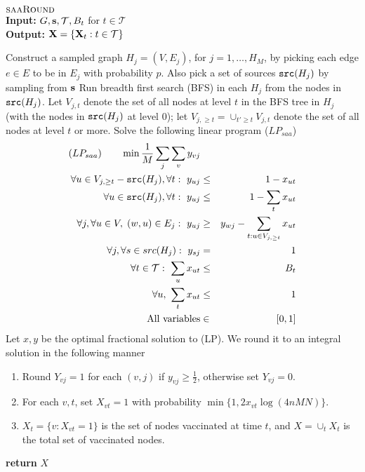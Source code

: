 \begin{algorithm}{}
\small
\caption{\small $\textsc{saaRound}{}$\\
\textbf{Input:} $G, \mathbf{s}, \mathcal{T}, B_t$ for $t\in\mathcal{T}$\\
\textbf{Output:} $\mathbf{X}=\{\mathbf{X}_t: t\in\mathcal{T}\}$
}
\label{alg:saaround}
\begin{algorithmic}[1]
\STATE
Construct a sampled graph $H_j=(V, E_j)$, for $j=1,\ldots,H_M$, by picking each edge $e\in E$ to be in $E_j$
with probability $p$. Also pick a set of sources $\texttt{src}(H_j)$ by sampling from $\mathbf{s}$
\STATE
Run breadth first search (BFS) in each $H_j$ from the nodes in $\texttt{src}(H_j)$.
Let $V_{j,t}$ denote the set of all nodes at level $t$ in the BFS tree in $H_j$ 
(with the nodes in $\texttt{src}(H_j)$ at level $0$); let $V_{j,\geq t}=\cup_{t'\geq t} V_{j,t}$ denote
the set of all nodes at level $t$ or more.
\STATE
Solve the following linear program ($LP_{saa}$)
\begin{eqnarray}
\label{eqn:obj}
(LP_{saa}) \qquad  \min \frac{1}{M}\sum_j \sum_v y_{vj} && \\
\label{eqn:xy}
\forall u \in V_{j, \geq t} - \texttt{src}(H_j), \forall t:\ y_{uj} &\leq& 1 - x_{ut} \\
\label{eqn:xy2}
\forall u \in \texttt{src}(H_j), \forall t:\ y_{uj} &\leq& 1 - \sum_t x_{ut} \\
\label{eqn1}
\forall j, \forall u\in V, \; (w, u)\in E_j:\ y_{uj} &\geq& y_{wj} - \sum_{t: u \in V_{j, \geq t}} x_{ut}\\
\label{eqn:src}
\forall j, \forall s \in src(H_j):\ y_{sj} &=& 1\\
\label{eqn:budget}
\forall t\in\mathcal{T}:\ \sum_u x_{ut} &\leq& B_t\\
\label{eqn:uniqt}
\forall u,\ \sum_t x_{ut} &\leq& 1\\
\mbox{All variables} &\in& [0, 1]
\end{eqnarray}
\STATE
Let $x, y$ be the optimal fractional solution to (LP).
We round it to an integral solution in the following manner
\begin{enumerate}
\item
Round $Y_{vj} = 1$ for each $(v,j)$ if $y_{vj} \geq \frac{1}{2}$, otherwise set $Y_{vj} = 0$.
\item
For each $v, t$, set $X_{vt}=1$ with probability $\min\{1, 2 x_{vt}\log(4nMN)\}$. 
\item
$X_t=\{v: X_{vt}=1\}$ is the set of nodes vaccinated at time $t$, and $X=\cup_t X_t$
is the total set of vaccinated nodes.
\end{enumerate}
\STATE \textbf{return} $X$
\end{algorithmic}
\end{algorithm}

